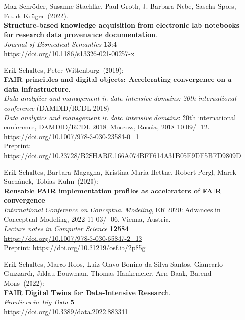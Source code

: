 \begin{thebibliography}{9}
 Max Schröder, Susanne Staehlke, Paul Groth, J.  Barbara Nebe, Sascha Spors, Frank Krüger~(2022): \\
\textbf{Structure-based knowledge acquisition from electronic lab notebooks for research data provenance documentation}.\\
\emph{Journal of Biomedical Semantics} \textbf{13}:4\\
\url{https://doi.org/10.1186/s13326-021-00257-x}

Erik Schultes, Peter Wittenburg~(2019): \\
\textbf{FAIR principles and digital objects: Accelerating convergence on a data infrastructure}.\\
\emph{Data analytics and management in data intensive domains: 20th international conference} (DAMDID/RCDL 2018)\\
\emph{Data analytics and management in data intensive domains}: 20th international conference,
{DAMDID}/{RCDL} 2018, Moscow, Russia, 2018-10-09/-{}-12. \\
\url{https://doi.org/10.1007/978-3-030-23584-0_1} \\
Preprint: \url{https://doi.org/10.23728/B2SHARE.166A074BFF614A31B05E9DF5BFD9809D}

Erik Schultes, Barbara Magagna, Kristina Maria Hettne, Robert Pergl, Marek Suchánek, Tobias Kuhn~(2020): \\
\textbf{Reusable {FAIR} implementation profiles as accelerators of {FAIR} convergence}.\\
\emph{International Conference on Conceptual Modeling}, ER 2020: Advances in Conceptual Modeling, 2022-11-03/-{}-06, Vienna, Austria. \\
\emph{Lecture notes in Computer Science} \textbf{12584} \\ 
\url{https://doi.org/10.1007/978-3-030-65847-2_13} \\
Preprint: \url{https://doi.org/10.31219/osf.io/2p85g}

Erik Schultes, Marco Roos, Luiz Olavo Bonino da Silva Santos, Giancarlo Guizzardi, Jildau Bouwman, Thomas Hankemeier, Arie Baak, Barend Mons~(2022): \\
\textbf{FAIR Digital Twins for Data-Intensive Research}.\\
\emph{Frontiers in Big Data} \textbf{5}\\
\url{https://doi.org/10.3389/data.2022.883341}


\end{thebibliography}
